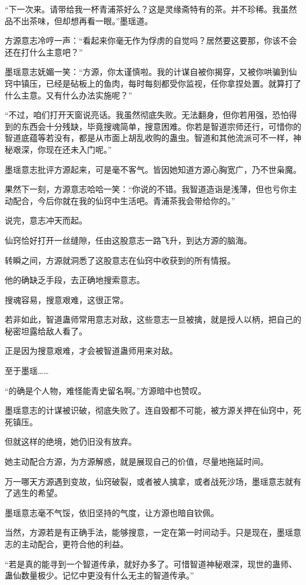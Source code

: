 \begin{this_body}
“下一次来。请带给我一杯青浦茶好么？这是灵缘斋特有的茶。并不珍稀。我虽然品不出茶味，但却想再看一眼。”墨瑶道。

方源意志冷哼一声：“看起来你毫无作为俘虏的自觉吗？居然要这要那，你该不会还在打什么主意吧？”

墨瑶意志妩媚一笑：“方源，你太谨慎啦。我的计谋自被你揭穿，又被你哄骗到仙窍中镇压，已经是砧板上的鱼肉，每时每刻都受你监视，任你拿捏处置。就算打了什么主意。又有什么办法实施呢？”

“不过，咱们打开天窗说亮话。我虽然彻底失败。无法翻身，但你若用强，恐怕得到的东西会十分残缺，毕竟搜魂简单，搜意困难。你若是智道宗师还行，可惜你的智道底蕴等若没有，都是从市面上胡乱收购的蛊虫。智道和其他流派可不一样，神秘艰深，你现在还未入门呢。”

墨瑶意志批评方源起来，可是毫不客气。皆因她知道方源心胸宽广，乃不世枭魔。

果然下一刻，方源意志哈哈一笑：“你说的不错。我智道造诣是浅薄，但也亏你主动配合，今后你就在我的仙窍中生活吧。青浦茶我会带给你的。”

说完，意志冲天而起。

仙窍恰好打开一丝缝隙，任由这股意志一路飞升，到达方源的脑海。

转瞬之间，方源就洞悉了这股意志在仙窍中收获到的所有情报。

他的确缺乏手段，去正确地搜索意志。

搜魂容易，搜意艰难，这很正常。

若非如此，智道蛊师常用意志对敌，这些意志一旦被擒，就是授人以柄，把自己的秘密坦露给敌人看了。

正是因为搜意艰难，才会被智道蛊师用来对敌。

至于墨瑶……

“的确是个人物，难怪能青史留名啊。”方源暗中也赞叹。

墨瑶意志的计谋被识破，彻底失败了。连自毁都不可能，被方源关押在仙窍中，死死镇压。

但就这样的绝境，她仍旧没有放弃。

她主动配合方源，为方源解惑，就是展现自己的价值，尽量地拖延时间。

万一哪天方源遇到变故，仙窍破裂，或者被人擒拿，或者战死沙场，墨瑶意志就有了逃生的希望。

墨瑶意志毫不气馁，依旧坚持的气度，让方源也暗自钦佩。

当然，方源若是有正确手法，能够搜意，一定在第一时间动手。只是现在，墨瑶意志的主动配合，更符合他的利益。

“若是真的能寻到一个智道传承，就好办多了。可惜智道神秘艰深，现世的蛊师、蛊仙数量极少。记忆中更没有什么无主的智道传承。”


\end{this_body}

